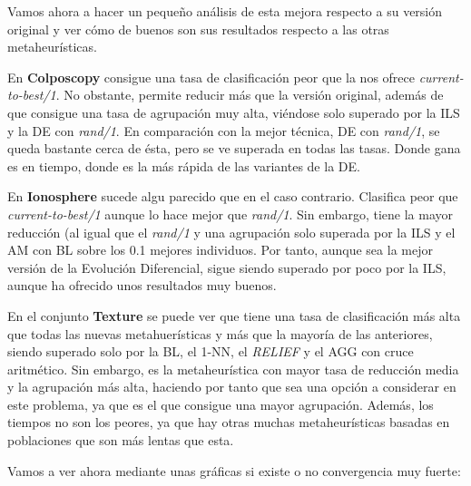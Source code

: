 \documentclass[11pt,a4paper]{article}
\begin{document}
Vamos ahora a hacer un pequeño análisis de esta mejora respecto a su versión original y ver cómo de buenos son sus resultados
respecto a las otras metaheurísticas.

En \textbf{Colposcopy} consigue una tasa de clasificación peor que la nos ofrece \textit{current-to-best/1}. No obstante, permite
reducir más que la versión original, además de que consigue una tasa de agrupación muy alta, viéndose solo superado por la ILS
y la DE con \textit{rand/1}. En comparación con la mejor técnica, DE con \textit{rand/1}, se queda bastante cerca de ésta, pero
se ve superada en todas las tasas. Donde gana es en tiempo, donde es la más rápida de las variantes de la DE.

En \textbf{Ionosphere} sucede algu parecido que en el caso contrario. Clasifica peor que \textit{current-to-best/1} aunque
lo hace mejor que \textit{rand/1}. Sin embargo, tiene la mayor reducción (al igual que el \textit{rand/1} y una agrupación solo
superada por la ILS y el AM con BL sobre los 0.1 mejores individuos. Por tanto, aunque sea la mejor versión de la Evolución
Diferencial, sigue siendo superado por poco por la ILS, aunque ha ofrecido unos resultados muy buenos.

En el conjunto \textbf{Texture} se puede ver que tiene una tasa de clasificación más alta que todas las nuevas metahuerísticas
y más que la mayoría de las anteriores, siendo superado solo por la BL, el 1-NN, el \textit{RELIEF} y el AGG con cruce aritmético.
Sin embargo, es la metaheurística con mayor tasa de reducción media y la agrupación más alta, haciendo por tanto que sea una opción
a considerar en este problema, ya que es el que consigue una mayor agrupación. Además, los tiempos no son los peores, ya que hay
otras muchas metaheurísticas basadas en poblaciones que son más lentas que esta.

Vamos a ver ahora mediante unas gráficas si existe o no convergencia muy fuerte:
\end{document}

